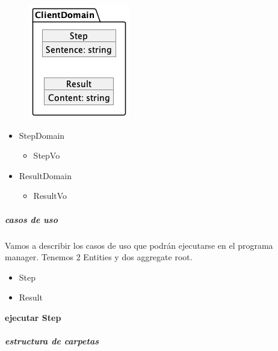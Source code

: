 \begin{figure}[H]
    \centering
    \includegraphics[height=0.4\textheight]{./part/Proyecto_ejecutivo/memoria_descriptiva/descripcionDelProyecto/client/uml/clientDomain}
    \caption[Diagrama de objetos de dominio]{}\label{fig:clientDomain}
\end{figure}

\begin{itemize}
    \item StepDomain
    \begin{itemize}
        \item StepVo
    \end{itemize}
    \item ResultDomain
    \begin{itemize}
        \item ResultVo
    \end{itemize}
\end{itemize}

\subparagraph{casos de uso}

Vamos a describir los casos de uso que podrán ejecutarse en el programa manager. Tenemos 2 Entities y dos aggregate root.

\begin{itemize}
    \item Step
    \item Result
\end{itemize}

\textbf{ejecutar Step}


\subparagraph{estructura de carpetas}







